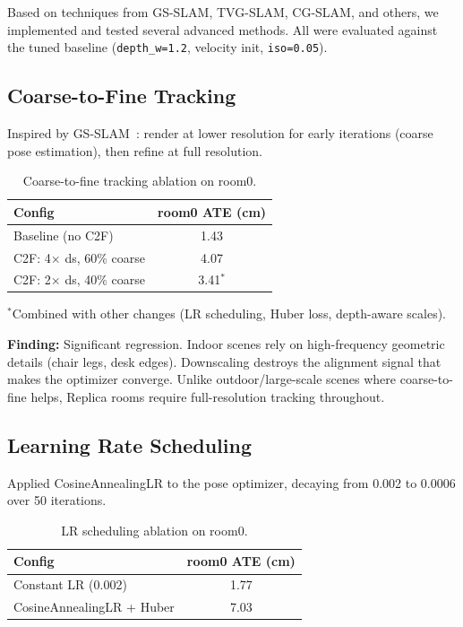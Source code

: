 \documentclass[10pt,twocolumn]{article}
\begin{document}
Based on techniques from GS-SLAM, TVG-SLAM, CG-SLAM, and others, we implemented and tested several advanced methods. All were evaluated against the tuned baseline (\texttt{depth\_w=1.2}, velocity init, \texttt{iso=0.05}).

\subsection{Coarse-to-Fine Tracking}

Inspired by GS-SLAM~\cite{gsslam}: render at lower resolution for early iterations (coarse pose estimation), then refine at full resolution.

\begin{table}[h]
\centering
\caption{Coarse-to-fine tracking ablation on room0.}
\label{tab:c2f}
\begin{tabular}{lc}
\toprule
\textbf{Config} & \textbf{room0 ATE (cm)} \\
\midrule
Baseline (no C2F) & 1.43 \\
C2F: 4$\times$ ds, 60\% coarse & 4.07 \\
C2F: 2$\times$ ds, 40\% coarse & 3.41$^*$ \\
\bottomrule
\end{tabular}
\end{table}
{\small $^*$Combined with other changes (LR scheduling, Huber loss, depth-aware scales).}

\textbf{Finding:} \textcolor{regressed}{Significant regression.} Indoor scenes rely on high-frequency geometric details (chair legs, desk edges). Downscaling destroys the alignment signal that makes the optimizer converge. Unlike outdoor/large-scale scenes where coarse-to-fine helps, Replica rooms require full-resolution tracking throughout.

\subsection{Learning Rate Scheduling}

Applied CosineAnnealingLR to the pose optimizer, decaying from 0.002 to 0.0006 over 50 iterations.

\begin{table}[h]
\centering
\caption{LR scheduling ablation on room0.}
\label{tab:lr_sched}
\begin{tabular}{lc}
\toprule
\textbf{Config} & \textbf{room0 ATE (cm)} \\
\midrule
Constant LR (0.002) & 1.77 \\
CosineAnnealingLR + Huber & 7.03 \\
\bottomrule
\end{tabular}
\end{table}
\end{document}
